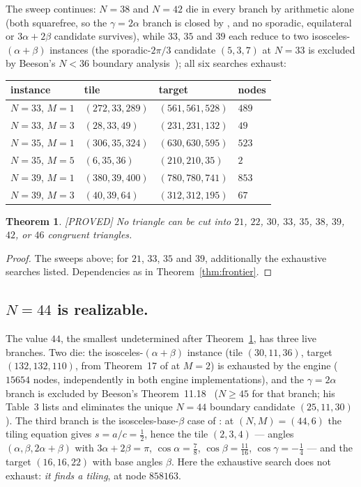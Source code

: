 \documentclass[11pt,reqno]{amsart}
\theoremstyle{plain}
\newtheorem{theorem}{Theorem}
\theoremstyle{definition}
\newcommand{\lab}[1]{\hfill\textnormal{\footnotesize\textsc{[#1]}}}
\begin{document}
The sweep continues: $N=38$ and $N=42$ die in every branch by
arithmetic alone (both squarefree, so the $\gamma=2\alpha$ branch is closed by
\cite[Thm.~11.7]{BeesonIso}, and no sporadic, equilateral or $3\alpha+2\beta$ candidate survives),
while $33$, $35$ and $39$ each reduce to two isosceles-$(\alpha{+}\beta)$ instances (the
sporadic-$2\pi/3$ candidate $(5,3,7)$ at $N=33$ is excluded by Beeson's $N<36$ boundary
analysis~\cite{BeesonIso}); all six searches exhaust:
\begin{center}
\begin{tabular}{llll}
instance & tile & target & nodes\\
\hline
$N{=}33$, $M{=}1$ & $(272,33,289)$ & $(561,561,528)$ & $489$\\
$N{=}33$, $M{=}3$ & $(28,33,49)$ & $(231,231,132)$ & $49$\\
$N{=}35$, $M{=}1$ & $(306,35,324)$ & $(630,630,595)$ & $523$\\
$N{=}35$, $M{=}5$ & $(6,35,36)$ & $(210,210,35)$ & $2$\\
$N{=}39$, $M{=}1$ & $(380,39,400)$ & $(780,780,741)$ & $853$\\
$N{=}39$, $M{=}3$ & $(40,39,64)$ & $(312,312,195)$ & $67$\\
\end{tabular}
\end{center}

\begin{theorem}\label{thm:frontier2}\lab{PROVED}
No triangle can be cut into $21$, $22$, $30$, $33$, $35$, $38$, $39$, $42$, or $46$ congruent
triangles.
\end{theorem}

\begin{proof}
The sweeps above; for $21$, $33$, $35$ and $39$, additionally the exhaustive searches listed.
Dependencies as in Theorem~\ref{thm:frontier}.
\end{proof}

\subsection*{$N=44$ is realizable.}
The value $44$, the smallest undetermined after Theorem~\ref{thm:frontier2}, has three live
branches. Two die: the isosceles-$(\alpha{+}\beta)$ instance (tile $(30,11,36)$, target
$(132,132,110)$, from Theorem~17 of \cite{BeesonIII} at $M=2$) is exhausted by the engine
($15654$ nodes, independently in both engine implementations), and the $\gamma=2\alpha$ branch
is excluded by Beeson's Theorem~11.18~\cite{BeesonIso} ($N\ge45$ for that branch; his Table~3
lists and eliminates the unique $N=44$ boundary candidate $(25,11,30)$). The third branch is the
isosceles-base-$\beta$ case of \cite[Thm.~14]{BeesonIII}: at $(N,M)=(44,6)$ the tiling equation
gives $s=a/c=\tfrac12$, hence the tile $(2,3,4)$ --- angles $(\alpha,\beta,2\alpha{+}\beta)$ with
$3\alpha+2\beta=\pi$, $\cos\alpha=\tfrac78$, $\cos\beta=\tfrac{11}{16}$,
$\cos\gamma=-\tfrac14$ --- and the target $(16,16,22)$ with base angles $\beta$. Here the
exhaustive search does not exhaust: \emph{it finds a tiling}, at node $858163$.
\end{document}
